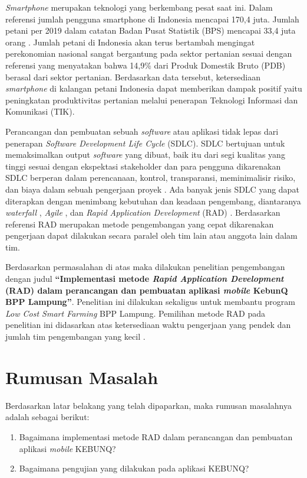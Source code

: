 \begin{flushleft}
\begin{justify}
    \textit{Smartphone} merupakan teknologi yang berkembang pesat saat ini. Dalam referensi \cite{web-datasmartphone} 
    jumlah pengguna smartphone di Indonesia mencapai 170,4 juta. Jumlah petani per 2019 dalam catatan Badan Pusat Statistik (BPS) mencapai 33,4 juta orang \cite{databps}. 
    Jumlah petani di Indonesia akan terus bertambah mengingat perekonomian nasional sangat bergantung pada sektor pertanian sesuai dengan 
    referensi \cite{jurnal-kajianAplikasi} yang menyatakan bahwa 14,9\% dari Produk Domestik Bruto (PDB) berasal dari sektor pertanian. Berdasarkan data tersebut, ketersediaan \textit{smartphone} di kalangan petani Indonesia dapat memberikan dampak positif yaitu peningkatan produktivitas pertanian melalui penerapan Teknologi Informasi dan  Komunikasi (TIK). 

    Perancangan dan pembuatan sebuah \emph{software} atau aplikasi tidak lepas dari 
    penerapan \emph{Software Development Life Cycle} (SDLC). SDLC bertujuan untuk memaksimalkan 
    output \emph{software} yang dibuat, baik itu dari segi kualitas yang tinggi sesuai dengan ekspektasi 
    stakeholder dan para pengguna \cite{sdlc} dikarenakan SDLC berperan dalam perencanaan, 
    kontrol, transparansi, meminimalisir risiko, dan biaya dalam sebuah pengerjaan proyek \cite{sdlc2}. 
    Ada banyak jenis SDLC yang dapat diterapkan dengan menimbang kebutuhan dan keadaan pengembang, diantaranya \emph{waterfall} \cite{waterfall}, \emph{Agile} \cite{agile}, dan \emph{Rapid Application Development} (RAD) \cite{Sukamto}. Berdasarkan referensi \cite{Sukamto} RAD merupakan metode pengembangan yang cepat dikarenakan pengerjaan dapat dilakukan secara paralel oleh tim lain atau anggota lain dalam tim.

    Berdasarkan permasalahan di atas maka dilakukan penelitian pengembangan dengan judul \textbf{“Implementasi metode \textit{Rapid Application Development} (RAD) dalam perancangan dan pembuatan aplikasi \textit{mobile} KebunQ BPP Lampung”}.  Penelitian ini dilakukan sekaligus untuk membantu program \textit{Low Cost Smart Farming} BPP Lampung. Pemilihan metode RAD pada penelitian ini didasarkan atas ketersediaan waktu pengerjaan yang pendek \cite{Sukamto} dan jumlah tim pengembangan yang kecil \cite{jurnal empiris}.
\\

    \section{Rumusan Masalah}
      Berdasarkan latar belakang yang telah dipaparkan, maka rumusan masalahnya adalah sebagai berikut:
      \begin{enumerate}
        \item Bagaimana implementasi metode RAD dalam perancangan dan pembuatan aplikasi \textit{mobile} KEBUNQ?
        \item Bagaimana pengujian yang dilakukan pada aplikasi KEBUNQ?\\
      \end{enumerate}

\end{justify}
\end{flushleft}
